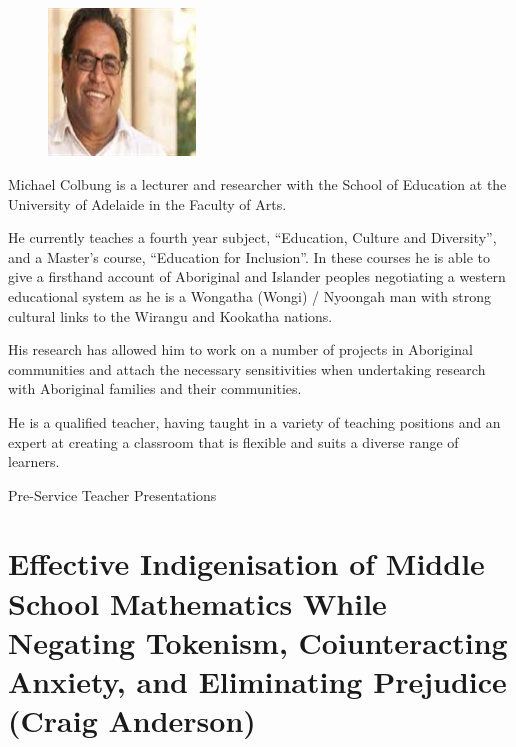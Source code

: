 \documentclass[twoside,14pt,a4paper,notitlepage]{memoir}
\begin{document}
\begin{figure}
\centering
\includegraphics[width=0.35\textwidth]{michael_colbung.jpeg}
\end{figure}

Michael Colbung is a lecturer and researcher with the School of Education at the University of Adelaide in the Faculty of Arts. 

He currently teaches a fourth year subject, “Education, Culture and Diversity”, and a Master’s course, “Education for Inclusion”. In these courses he is able to give a firsthand account of Aboriginal and Islander peoples negotiating a western educational system as he is a Wongatha (Wongi) / Nyoongah man with strong cultural links to the Wirangu and Kookatha nations.

His research has allowed him to work on a number of projects in Aboriginal communities and attach the necessary sensitivities when undertaking research with Aboriginal families and their communities.

He is a qualified teacher, having taught in a variety of teaching positions and an expert at creating a classroom that is flexible and suits a diverse range of learners.
\vfill



\pagebreak
\vspace*{2cm}
{\Huge Pre-Service Teacher Presentations}
\vspace{2cm}

\section*{Effective Indigenisation of Middle School Mathematics While Negating Tokenism, Coiunteracting Anxiety, and Eliminating Prejudice (Craig Anderson)}
\label{aut:anderson}
\end{document}
